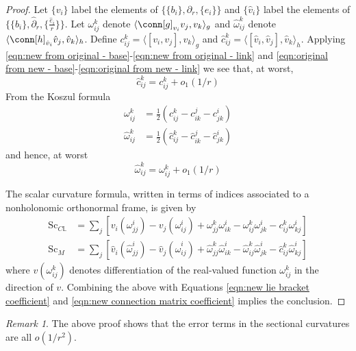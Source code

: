 \documentclass[12pt, reqno]{amsart}
\theoremstyle{plain} %
\theoremstyle{definition}
\theoremstyle{remark}
\newtheorem{remark}[theorem]{Remark}
\numberwithin{equation}{section}
\newcommand{\dom}[1]{\hat{#1}}
\newcommand{\bund}[1]{\mathbb{#1}}
\newcommand{\Sc}{\mathrm{Sc}}
\newcommand{\inner}[1]{\langle #1 \rangle}
\begin{document}
\begin{proof}
    Let \(\{v_i\}\) label the elements of \(\{\{b_i\}, \partial_r, \{e_i\}\}\) and \(\{\dom{v}_i\}\) label the elements of \(\{\{\dom{b}_i\}, \dom{\partial}_r, \{\frac{\dom{e}_i}{r}\}\}\).
    Let \(\omega_{ij}^k\) denote \(\inner{\conn[g]_{v_i} v_j, v_k}_g\) and \(\dom{\omega}_{ij}^k\) denote \(\inner{\conn[h]_{\dom{v}_i} \dom{v}_j, \dom{v}_k}_h\).
    Define \(c_{ij}^k = \inner{[v_i, v_j], v_k}_g\) and \(\dom{c}_{ij}^k = \inner{[\dom{v}_i, \dom{v}_j], \dom{v}_k}_h\).
    Applying \eqref{eqn:new from original - base}-\eqref{eqn:new from original - link} and \eqref{eqn:original from new - base}-\eqref{eqn:original from new - link} we see that, at worst,
    \begin{equation}\label{eqn:new lie bracket coefficient}
        \dom{c}_{ij}^k = c_{ij}^k + o_1(1/r)
    \end{equation}
    From the Koszul formula
    \begin{align*}
        \omega_{ij}^k &= \frac{1}{2} (c_{ij}^k - c_{ik}^j - c_{jk}^i) \\
        \dom{\omega}_{ij}^k &= \frac{1}{2} (\dom{c}_{ij}^k - \dom{c}_{ik}^j - \dom{c}_{jk}^i)
    \end{align*}
    and hence, at worst
    \begin{equation}\label{eqn:new connection matrix coefficient}
        \dom{\omega}_{ij}^k = \omega_{ij}^k + o_1(1/r)
    \end{equation}

    The scalar curvature formula, written in terms of indices associated to a nonholonomic orthonormal frame, is given by
    \begin{align*}
        \Sc_{ C\bund{L} } &= \sum_j \left[ v_i (\omega_{j j}^i) - v_j (\omega_{i j}^i) + \omega_{j j}^k \omega_{i k}^i - \omega_{i j}^k \omega_{j k}^i - c_{i j}^k \omega_{k j}^i \right] \\
        \Sc_{M} &= \sum_j \left[ \dom{v}_i (\hat{\omega}_{j j}^i) - \dom{v}_j (\hat{\omega}_{i j}^i) + \hat{\omega}_{j j}^k \hat{\omega}_{i k}^i - \hat{\omega}_{i j}^k \hat{\omega}_{j k}^i - \hat{c}_{i j}^k \hat{\omega}_{k j}^i \right]
    \end{align*}
    where \(v(\omega_{ij}^k)\) denotes differentiation of the real-valued function \(\omega_{ij}^k\) in the direction of \(v\).
    Combining the above with Equations \eqref{eqn:new lie bracket coefficient} and \eqref{eqn:new connection matrix coefficient} implies the conclusion.
\end{proof}

\begin{remark}\label{rmk:asymptotic sectional curvature for family of cones}
    The above proof shows that the error terms in the sectional curvatures are all \(o(1/r^2)\).
\end{remark}
\end{document}
